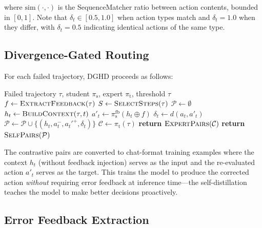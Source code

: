 \documentclass[11pt]{article}
\newcommand{\ours}{DGHD}
\newcommand{\student}{\pi_{\text{s}}}
\newcommand{\teacher}{\pi_{\text{t}}}
\newcommand{\selfteacher}{\pi_{\text{s}}^{\text{fb}}}
\newcommand{\divergence}{\delta}
\newcommand{\threshold}{\tau}
\begin{document}
where $\text{sim}(\cdot, \cdot)$ is the SequenceMatcher ratio between action contents, bounded in $[0, 1]$. Note that $\divergence_t \in [0.5, 1.0]$ when action types match and $\divergence_t = 1.0$ when they differ, with $\divergence_t = 0.5$ indicating identical actions of the same type.

\subsection{Divergence-Gated Routing}

For each failed trajectory, \ours{} proceeds as follows:

\begin{algorithm}[H]
\caption{\ours{}: Divergence-Gated Hierarchical Distillation}
\label{alg:dghd}
\begin{algorithmic}[1]
\REQUIRE Failed trajectory $\tau$, student $\student$, expert $\teacher$, threshold $\threshold$
\STATE $f \leftarrow \textsc{ExtractFeedback}(\tau)$ 
\STATE $S \leftarrow \textsc{SelectSteps}(\tau)$ 
\STATE $\mathcal{P} \leftarrow \emptyset$ 
    \STATE $h_t \leftarrow \textsc{BuildContext}(\tau, t)$ 
    \STATE $a'_t \leftarrow \selfteacher(h_t \oplus f)$ 
    \STATE $\divergence_t \leftarrow d(a_t, a'_t)$
    \IF{$\divergence_t \geq \threshold$}
        \STATE $\mathcal{P} \leftarrow \mathcal{P} \cup \{(h_t, a_t^{-}, a_t'^{+}, \divergence_t)\}$ 
    \ENDIF
\ENDFOR
{}
    \STATE $\mathcal{C} \leftarrow \teacher(\tau)$ 
    \STATE \textbf{return} $\textsc{ExpertPairs}(\mathcal{C})$
\ELSE
    \STATE \textbf{return} $\textsc{SelfPairs}(\mathcal{P})$
\ENDIF
\end{algorithmic}
\end{algorithm}

The contrastive pairs are converted to chat-format training examples where the context $h_t$ (without feedback injection) serves as the input and the re-evaluated action $a'_t$ serves as the target. This trains the model to produce the corrected action \emph{without} requiring error feedback at inference time---the self-distillation teaches the model to make better decisions proactively.

\subsection{Error Feedback Extraction}
\end{document}
